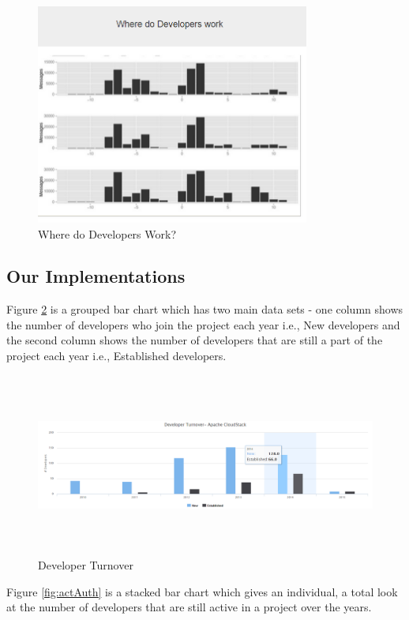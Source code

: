 \documentclass[double,12pt]{beavtex}
\begin{document}
\begin{figure}[H]
\begin{center}
\includegraphics[width=90mm]{image12.PNG}
\end{center}
\caption{Where do Developers Work?}
\label{fig:devWork}
\end{figure}

\subsection{Our Implementations}
Figure \ref{fig:devTurn} is a grouped bar chart which has two main data sets - one column shows the number of developers who join the project each year i.e., New developers and the second column shows the number of developers that are still a part of the project each year i.e., Established developers.

\begin{figure}[H]
\centering
\includegraphics[width=130mm,height=60mm]{image1.PNG}
\caption{Developer Turnover}
\label{fig:devTurn}
\end{figure}

Figure \ref{fig:actAuth} is a stacked bar chart which gives an individual, a total look at the number of developers that are still active in a project over the years.
\end{document}
